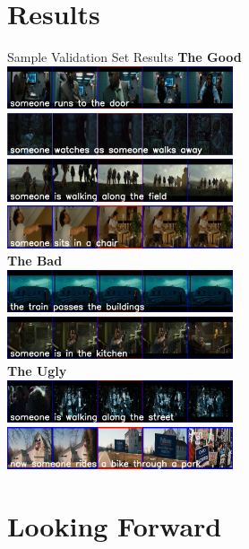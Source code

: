 \documentclass{beamer}
\begin{document}
\section{Results}
\begin{frame}{Sample Validation Set Results}
    \textbf{The Good}\\[2mm]
    \includegraphics[width=0.5\textwidth]{images/230350439_genCap.png}\hspace*{0.01\textwidth} \includegraphics[width=0.5\textwidth]{images/110270280_genCapEdited.png}\\[2mm]
    \includegraphics[width=0.5\textwidth]{images/110510033_genCap.png}\hspace*{0.01\textwidth} \includegraphics[width=0.5\textwidth]{images/140760125_genCap.png}\\[2mm]
    \textbf{The Bad}\\[2mm]
    \includegraphics[width=0.5\textwidth]{images/110260059_genCap.png}\hspace*{0.01\textwidth} \includegraphics[width=0.5\textwidth]{images/110260532_genCap.png}\\[2mm]
    \textbf{The Ugly}\\[2mm]
    \includegraphics[width=0.5\textwidth]{images/110510496_genCap.png}\hspace*{0.01\textwidth} \includegraphics[width=0.5\textwidth]{images/140770020_genCap.png}\\
\end{frame}
\section{Looking Forward}


\end{document}
